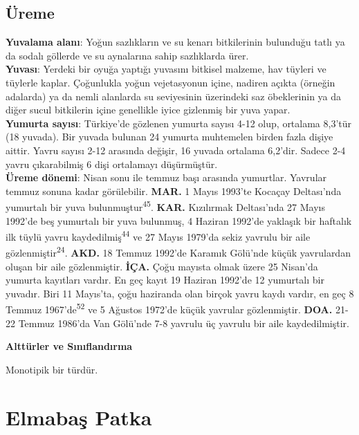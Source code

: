 \documentclass[
  letterpaper,
  DIV=11,
  numbers=noendperiod]{scrreprt}
\begin{document}
\hypertarget{uxfcreme-21}{%
\subsection{\texorpdfstring{\textbf{Üreme}}{Üreme}}\label{uxfcreme-21}}

\textbf{Yuvalama alanı}: Yoğun sazlıkların ve su kenarı bitkilerinin
bulunduğu tatlı ya da sodalı göllerde ve su aynalarına sahip sazlıklarda
ürer.\\
\textbf{Yuvası}: Yerdeki bir oyuğa yaptığı yuvasını bitkisel malzeme,
hav tüyleri ve tüylerle kaplar. Çoğunlukla yoğun vejetasyonun içine,
nadiren açıkta (örneğin adalarda) ya da nemli alanlarda su seviyesinin
üzerindeki saz öbeklerinin ya da diğer sucul bitkilerin içine genellikle
iyice gizlenmiş bir yuva yapar.\\
\textbf{Yumurta sayısı}: Türkiye'de gözlenen yumurta sayısı 4-12 olup,
ortalama 8,3'tür (18 yuvada). Bir yuvada bulunan 24 yumurta muhtemelen
birden fazla dişiye aittir. Yavru sayısı 2-12 arasında değişir, 16
yuvada ortalama 6,2'dir. Sadece 2-4 yavru çıkarabilmiş 6 dişi ortalamayı
düşürmüştür.\\
\textbf{Üreme dönemi}: Nisan sonu ile temmuz başı arasında yumurtlar.
Yavrular temmuz sonuna kadar görülebilir. \textbf{MAR.} 1 Mayıs 1993'te
Kocaçay Deltası'nda yumurtalı bir yuva bulunmuştur\textsuperscript{45}.
\textbf{KAR.} Kızılırmak Deltası'nda 27 Mayıs 1992'de beş yumurtalı bir
yuva bulunmuş, 4 Haziran 1992'de yaklaşık bir haftalık ilk tüylü yavru
kaydedilmiş\textsuperscript{44} ve 27 Mayıs 1979'da sekiz yavrulu bir
aile gözlenmiştir\textsuperscript{24}. \textbf{AKD.} 18 Temmuz 1992'de
Karamık Gölü'nde küçük yavrulardan oluşan bir aile gözlenmiştir.
\textbf{İÇA.} Çoğu mayısta olmak üzere 25 Nisan'da yumurta kayıtları
vardır. En geç kayıt 19 Haziran 1992'de 12 yumurtalı bir yuvadır. Biri
11 Mayıs'ta, çoğu haziranda olan birçok yavru kaydı vardır, en geç 8
Temmuz 1967'de\textsuperscript{52} ve 5 Ağustos 1972'de küçük yavrular
gözlenmiştir. \textbf{DOA.} 21-22 Temmuz 1986'da Van Gölü'nde 7-8
yavrulu üç yavrulu bir aile kaydedilmiştir.

\textbf{Alttürler ve Sınıflandırma}

Monotipik bir türdür.

\hypertarget{elmabaux15f-patka}{%
\section{Elmabaş Patka}\label{elmabaux15f-patka}}
\end{document}

